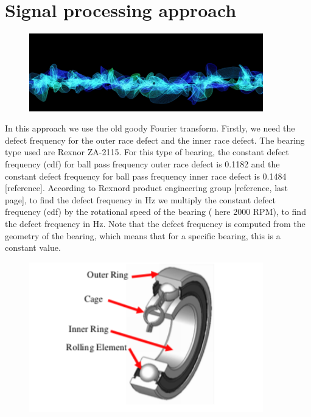 \documentclass[11pt, oneside]{article}   	%
\begin{document}
\section{Signal processing approach}
\begin{figure}[H] %
   \centering
   \includegraphics[width=4in]{vibration} 
   \caption{}
   \label{fig:example}
\end{figure}
In this approach we use the old goody Fourier transform. Firstly, we need the defect frequency for the outer race defect and the inner race defect. The bearing type used are Rexnor ZA-2115. For this type of bearing, the constant defect frequency (cdf) for ball pass frequency outer race defect is 0.1182 and the constant defect frequency for ball pass frequency inner race defect is 0.1484 [reference]. According to Rexnord product engineering group [reference, last page], to find the defect frequency in Hz we multiply the constant defect frequency (cdf) by the rotational speed of the bearing ( here 2000 RPM), to find the defect frequency in Hz. Note that the defect frequency is computed from the geometry of the bearing, which means that for a specific bearing, this is a constant value.
\begin{figure}[htbp] %
   \centering
   \includegraphics[width=4in]{bearing.png} 
   \caption{}
   \label{fig:example}
\end{figure}
\end{document}
